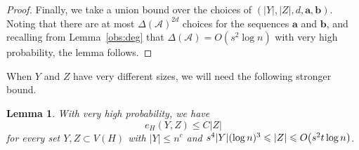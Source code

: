 \documentclass[10pt,a4paper]{amsart}
\newcommand\pig[1]{\scalerel*[5pt]{\normalsize#1}{%
  \ensurestackMath{\addstackgap[0.5pt]{\normalsize#1}}}}
\newtheorem{lemma}[theorem]{Lemma}
\numberwithin{theorem}{section}
\renewcommand{\(}{\bigl(}
\renewcommand{\)}{\bigr)\vphantom{)}}
\newcommand{\cA}{\mathcal A}
\renewcommand{\le}{\leqslant}
\def\va{\mathbf{a}}
\def\vb{\mathbf{b}}
\begin{document}
\begin{proof}
Finally, we take a union bound over the choices of $(|Y|,|Z|,d,\va,\vb)$. Noting that there are at most $\Delta(\cA)^{2d}$ choices for the sequences $\va$ and $\vb$, and recalling from Lemma~\ref{obs:deg} that $\Delta(\cA) = O( s^2 \log n)$ with very high probability,  the lemma follows.
\end{proof}

When $Y$ and $Z$ have very different sizes, we will need the following stronger bound. 

\begin{lemma}\label{lem:intersection:asym}
With very high probability, we have
\begin{equation}\label{eq:intersection:asym}
e_H(Y,Z) \le C |Z|
\end{equation}
for every set $Y,Z \subset V(H)$ with $|Y| \le n^c$ and $s^4 |Y| (\log n)^3 \le |Z| \le O\pig( s^2 t \log n \pig)$. 
\end{lemma}
\end{document}
